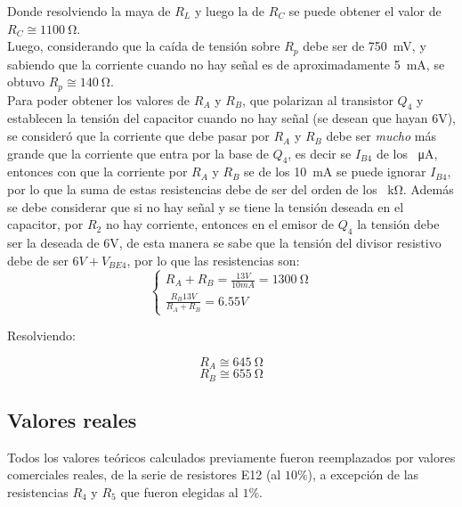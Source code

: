 \documentclass[letterpaper, 10 pt, conference]{ieeeconf}  %
\begin{document}
Donde resolviendo la maya de $R_L$ y luego la de $R_C$ se puede obtener el valor de $R_C \cong \qty{1100}{\ohm}$. \\

Luego, considerando que la caída de tensión sobre $R_p$ debe ser de \qty{750}{\milli\volt}, y sabiendo que la corriente cuando no hay señal es de aproximadamente \qty{5}{\milli\ampere}, se obtuvo $R_p \cong \qty{140}{\ohm}$. \\

Para poder obtener los valores de $R_A$ y $R_B$, que polarizan al transistor $Q_4$ y establecen la tensión del capacitor cuando no hay señal (se desean que hayan 6V), se consideró que la corriente que debe pasar por $R_A$ y $R_B$ debe ser \textit{mucho} más grande que la corriente que entra por la base de $Q_4$, es decir se $I_{B4}$ de los \qty{}{\micro\ampere}, entonces con que la corriente por $R_A$ y $R_B$ se de los \qty{10}{\milli\ampere} se puede ignorar $I_{B4}$, por lo que la suma de estas resistencias debe de ser del orden de los \qty{}{\kilo\ohm}. Además se debe considerar que si no hay señal y se tiene la tensión deseada en el capacitor, por $R_2$ no hay corriente, entonces en el emisor de $Q_4$ la tensión debe ser la deseada de 6V, de esta manera se sabe que la tensión del divisor resistivo debe de ser $6V+V_{BE4}$, por lo que las resistencias son:
\begin{equation*}
  \begin{cases*}
    R_A + R_B = \frac{13V}{10mA} = \qty{1300}{\ohm} \\
    \frac{R_B 13V}{R_A+R_B} = 6.55V
  \end{cases*}
\end{equation*}

Resolviendo:

\begin{equation*}
  R_A \cong \qty{645}{\ohm}
\end{equation*}
\begin{equation*}
  R_B \cong \qty{655}{\ohm}
\end{equation*}

\subsection{Valores reales}
Todos los valores teóricos calculados previamente fueron reemplazados por valores comerciales reales, de la serie de resistores E12 (al $10\%$), a excepción de las resistencias $R_4$ y $R_5$ que fueron elegidas al $1\%$.
\end{document}
